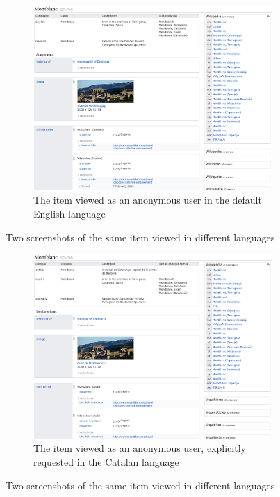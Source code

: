 \begin{figure}
  \begin{subfigure}{\textwidth}
    \includegraphics[width=\textwidth]{screenshots/montblanc-en}
    \caption{The \gls{item} viewed as an anonymous user in the default English language}
    \label{fig:montblanc-en}
  \end{subfigure}
  \caption{Two screenshots of the same \gls{item} viewed in different languages}
  \label{fig:montblanc}
\end{figure}
\begin{figure}\ContinuedFloat
  \begin{subfigure}{\textwidth}
    \includegraphics[width=\textwidth]{screenshots/montblanc-ca}
    \caption{The \gls{item} viewed as an anonymous user, explicitly requested in the Catalan language}
    \label{fig:montblanc-ca}
  \end{subfigure}
  \caption{Two screenshots of the same \gls{item} viewed in different languages}
\end{figure}


